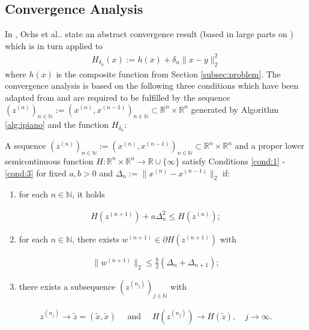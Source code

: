 \documentclass[onecolumn,final,a4paper,13pt,reqno]{siamart}
\makeatletter
\DeclareRobustCommand\onedot{\futurelet\@let@token\@onedot}
\def\@onedot{\ifx\@let@token.\else.\null\fi\xspace}
\def\etal{{et al}\onedot}
\makeatother
\begin{document}
\subsection{Convergence Analysis}
\label{ipiano:ipiano-analysis}

In \cite{OchsChenBroxPock:2013}, Ochs \etal state an abstract convergence result (based in large parts on \cite{AttouchBolteSvaiter:2013}) which is in turn applied to
\begin{align}
	H_{\delta_n}(x) := h(x) + \delta_n\|x - y\|_2^2\label{eq:H}
\end{align}
where $h(x)$ is the composite function from Section \ref{subsec:problem}. The convergence analysis is based on the following three conditions which have been adapted from \cite{AttouchBolteSvaiter:2013} and are required to be fulfilled by the sequence $(z^{(n)})_{n \in \mathbb{N}} := (x^{(n)}, x^{(n - 1)})_{n \in \mathbb{N}} \subset \mathbb{R}^{n} \times \mathbb{R}^n$ generated by Algorithm \ref{alg:ipiano} and the function $H_{\delta_n}$:

\begin{definitionmd}
	A sequence $(z^{(n)})_{n \in \mathbb{N}} := (x^{(n)}, x^{(n - 1)})_{n \in \mathbb{N}} \subset \mathbb{R}^{n} \times \mathbb{R}^n$ and a proper lower semicontinuous function $H : \mathbb{R}^{n} \times \mathbb{R}^n \rightarrow \mathbb{R} \cup \{\infty\}$ satisfy Conditions \ref{cond:1} - \ref{cond:3} for fixed $a,b > 0$ and $\Delta_n := \|x^{(n)} - x^{(n - 1)}\|_2$ if:
	\begin{enumerate}[label=(H\arabic*)]
		\item for each $n \in \mathbb{N}$, it holds\label{cond:1}
	\end{enumerate}
	\begin{align}
		H(z^{(n + 1)}) + a\Delta_n^2 \leq H(z^{(n)});
	\end{align}
	\begin{enumerate}[label=(H\arabic*)]
		\setcounter{enumi}{1}
		\item for each $n \in \mathbb{N}$, there exists $w^{(n + 1)} \in \partial H(z^{(n + 1)})$ with\label{cond:2}
	\end{enumerate}
	\begin{align}
		\|w^{(n + 1)}\|_2 \leq \frac{b}{2}(\Delta_n + \Delta_{n + 1});
	\end{align}
	\begin{enumerate}[label=(H\arabic*)]
		\setcounter{enumi}{2}
		\item there exists a subsequence $(z^{(n_j)})_{j \in \mathbb{N}}$ with\label{cond:3}
	\end{enumerate}
	\begin{align}
		z^{(n_j)} \rightarrow \tilde{z} = (\tilde{x}, \tilde{x})\quad\text{ and }\quad H(z^{(n_j)}) \rightarrow H(\tilde{z}),\quad j \rightarrow \infty.
	\end{align}\label{def:conditions}
\end{definitionmd}
\end{document}
